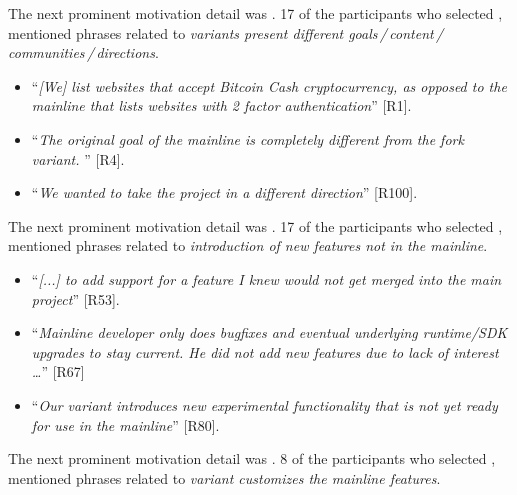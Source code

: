 \nd The next prominent  motivation detail was . 17 of the participants who selected , mentioned phrases related to \emph{variants present different goals\,/\,content\,/\,communities\,/\,directions}.

\begin{itemize}[leftmargin=*]
\item ``\emph{[We] %
list websites that accept Bitcoin Cash cryptocurrency, as opposed to the mainline that lists websites with 2 factor authentication}'' [R1].
\item ``\emph{The original goal of the mainline is completely different from the fork variant. %
}'' [R4].
\item  ``\emph{We wanted to take the project in a different direction}'' [R100].
\end{itemize}

\nd The next prominent  motivation detail was .
17 of the participants who selected , mentioned phrases related to \emph{introduction of new features not in the mainline}.

\begin{itemize}[leftmargin=*]
\item ``\emph{[...] to add support for a feature I knew would not get merged into the main project}'' [R53].
\item ``\emph{Mainline developer only does bugfixes and eventual underlying runtime/SDK upgrades to stay current. He did not add new features due to lack of interest \ldots}'' [R67]
\item ``\emph{Our variant introduces new experimental functionality that is not yet ready for use in the mainline}'' [R80].
\end{itemize}

\nd The next prominent  motivation detail was .
8 of the participants who selected , mentioned phrases related to \emph{variant customizes the mainline features}.


